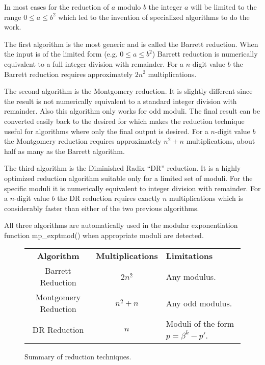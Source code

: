 \documentclass{article}
\begin{document}
In most cases for the reduction of $a$ modulo $b$ the integer $a$ will be limited to the range 
$0 \le a \le b^2$ which led to the invention of specialized algorithms to do the work.

The first algorithm is the most generic and is called the Barrett reduction.  When the input is of the 
limited form (e.g. $0 \le a \le b^2$) Barrett reduction is numerically equivalent to a full integer
division with remainder.  For a $n$-digit value $b$ the Barrett reduction requires approximately $2n^2$
multiplications.

The second algorithm is the Montgomery reduction.  It is slightly different since the result is not
numerically equivalent to a standard integer division with remainder.  Also this algorithm only works for
odd moduli.  The final result can be converted easily back to the desired for which makes the reduction 
technique useful for algorithms where only the final output is desired.  For a $n$-digit value $b$ the 
Montgomery reduction requires approximately $n^2 + n$ multiplications, about half as many as the 
Barrett algorithm.  

The third algorithm is the Diminished Radix ``DR'' reduction.  It is a highly optimized reduction algorithm
suitable only for a limited set of moduli.  For the specific moduli it is numerically equivalent to
integer division with remainder.  For a $n$-digit value $b$ the DR reduction rquires exactly $n$
multiplications which is considerably faster than either of the two previous algorithms.

All three algorithms are automatically used in the modular exponentiation function mp\_exptmod() when 
appropriate moduli are detected.

\begin{figure}[here]
\begin{small}
\begin{center}
\begin{tabular}{|c|c|l|}
\hline \textbf{Algorithm} & \textbf{Multiplications} & \textbf{Limitations} \\
 Barrett Reduction  & $2n^2$ & Any modulus. \\
 Montgomery Reduction & $n^2 + n$ & Any odd modulus. \\
 DR Reduction & $n$ & Moduli of the form  $p = \beta^k - p'$.\\
\hline
\end{tabular}
\caption{Summary of reduction techniques.}
\end{center}
\end{small}
\end{figure}
\end{document}
